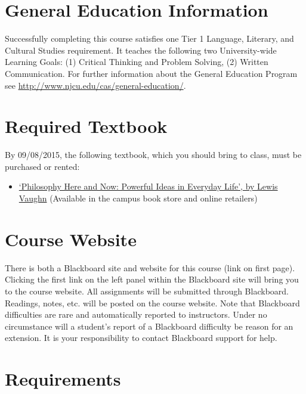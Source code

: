 \documentclass[article,oneside]{memoir}
\begin{document}
\section{General Education Information} 
Successfully completing this course satisfies one Tier 1 Language, Literary, and Cultural Studies requirement. It teaches the following two University-wide Learning Goals: (1) Critical Thinking and Problem Solving, (2) Written Communication. For further information about the General Education Program see \href{http://www.njcu.edu/cas/general-education/}{http://www.njcu.edu/cas/general-education/}.

\section{Required Textbook}

By 09/08/2015, the following textbook, which you should bring to class, must be purchased or rented:

\begin{itemize}
\item
  \href{http://www.amazon.com/Philosophy-Here-Now-Powerful-Everyday/dp/0199765227}{`Philosophy  Here and Now: Powerful Ideas in Everyday Life', by Lewis Vaughn}  (Available in the campus book store and online retailers)
\end{itemize}


\section{Course Website}
There is both a Blackboard site and website for this course (link on first page). Clicking the first link on the left panel within the Blackboard site will bring you to the course website. All assignments will be submitted through Blackboard. Readings, notes, etc. will be posted on the course website. Note that Blackboard difficulties are rare and automatically reported to instructors. Under no circumstance will a student's report of a Blackboard difficulty be reason for an extension. It is your responsibility to contact Blackboard support for help.




\section{Requirements}
\end{document}
